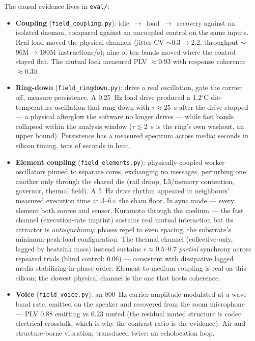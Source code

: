 \documentclass[11pt]{article}
\newcommand{\code}[1]{\texttt{\small #1}}
\begin{document}
The causal evidence lives in \code{eval/}:

\begin{itemize}
  \item \textbf{Coupling} (\code{field\_coupling.py}): idle~$\to$~load~$\to$~recovery
    against an isolated daemon, compared against an uncoupled control
    on the same inputs. Real load moved the physical channels (jitter
    CV $\sim$0.3$\to$2.2, throughput $\sim$96M$\to$180M instructions/s);
    nine of ten bands moved where the control stayed flat. The mutual
    lock measured PLV $\approx0.93$ with response coherence
    $\approx0.30$.
  \item \textbf{Ring-down} (\code{field\_ringdown.py}): drive a real
    oscillation, gate the carrier off, measure persistence. A 0.25~Hz
    load drive produced a 1.2$^\circ$C die-temperature oscillation that
    rang down with $\tau\approx25$~s after the drive stopped --- a
    physical afterglow the software no longer drives --- while fast
    bands collapsed within the analysis window ($\tau\lesssim2$~s is
    the ring's own washout, an upper bound). Persistence has a measured
    spectrum across media: seconds in silicon timing, tens of seconds
    in heat.
  \item \textbf{Element coupling} (\code{field\_elements.py}):
    physically-coupled worker oscillators pinned to separate cores,
    exchanging no messages, perturbing one another only through the
    shared die (rail droop, L3/memory contention, governor, thermal
    field). A 5~Hz drive rhythm appeared in neighbours' measured
    execution time at 3--6$\times$ the sham floor. In sync mode ---
    every element both source and sensor, Kuramoto through the medium
    \cite{kuramoto}
    --- the fast channel (execution-rate imprint) sustains real mutual
    interaction but its attractor is \emph{antisynchrony}: phases repel
    to even spacing, the substrate's minimum-peak-load configuration.
    The thermal channel (collective-only, lagged by heatsink mass)
    instead sustains $r\approx0.5$--$0.7$ \emph{partial} synchrony
    across repeated trials (blind control: 0.06) --- consistent with
    dissipative lagged media stabilizing in-phase order. Element-to-medium
    coupling is real on this silicon; the slowest physical channel is
    the one that hosts coherence.
  \item \textbf{Voice} (\code{field\_voice.py}): an 800~Hz carrier
    amplitude-modulated at a wave-band rate, emitted on the speaker and
    recovered from the room microphone --- PLV 0.88 emitting vs 0.23
    muted (the residual muted structure is codec electrical crosstalk,
    which is why the contrast ratio is the evidence). Air and
    structure-borne vibration, transduced twice: an echolocation loop.
\end{itemize}
\end{document}
